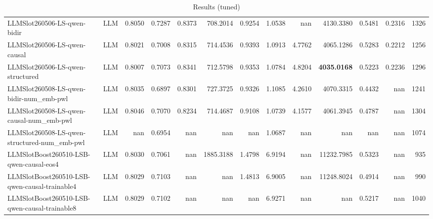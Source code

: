 \begin{table}[htbp]
{\begin{tabular}{ll|rrrrrrrrrr|r}
LLMSlot260506-LS-qwen-bidir & LLM & 0.8050 & 0.7287 & 0.8373 & 708.2014 & 0.9254 & 1.0538 & nan & 4130.3380 & 0.5481 & 0.2316 & 1326 \\
LLMSlot260506-LS-qwen-causal & LLM & 0.8021 & 0.7008 & 0.8315 & 714.4536 & 0.9393 & 1.0913 & 4.7762 & 4065.1286 & 0.5283 & 0.2212 & 1256 \\
LLMSlot260506-LS-qwen-structured & LLM & 0.8007 & 0.7073 & 0.8341 & 712.5798 & 0.9353 & 1.0784 & 4.8204 & \textbf{4035.0168} & 0.5223 & 0.2236 & 1296 \\
LLMSlot260508-LS-qwen-bidir-num\_emb-pwl & LLM & 0.8035 & 0.6897 & 0.8301 & 727.3725 & 0.9326 & 1.1085 & 4.2610 & 4070.3315 & 0.4432 & nan & 1241 \\
LLMSlot260508-LS-qwen-causal-num\_emb-pwl & LLM & 0.8046 & 0.7070 & 0.8234 & 714.4687 & 0.9108 & 1.0739 & 4.1577 & 4061.3945 & 0.4787 & nan & 1304 \\
LLMSlot260508-LS-qwen-structured-num\_emb-pwl & LLM & nan & 0.6954 & nan & nan & nan & 1.0687 & nan & nan & nan & nan & 1074 \\
LLMSlotBoost260510-LSB-qwen-causal-eos4 & LLM & 0.8030 & 0.7061 & nan & 1885.3188 & 1.4798 & 6.9194 & nan & 11232.7985 & 0.5323 & nan & 935 \\
LLMSlotBoost260510-LSB-qwen-causal-trainable4 & LLM & 0.8029 & 0.7103 & nan & nan & 1.4813 & 6.9005 & nan & 11248.8024 & 0.4914 & nan & 990 \\
LLMSlotBoost260510-LSB-qwen-causal-trainable8 & LLM & 0.8029 & 0.7102 & nan & nan & nan & 6.9271 & nan & nan & 0.5217 & nan & 1040 \\
\bottomrule
\end{tabular}
}
\caption{Results (tuned)}
\label{tab:results_tuned}
\end{table}